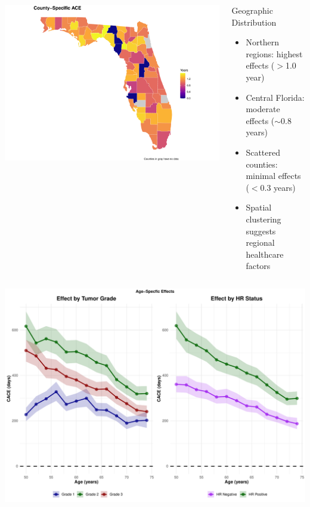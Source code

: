 \documentclass{beamer}
\begin{document}
 

  \begin{frame}{}
    \begin{columns}
  
    \includegraphics[width=1.1\textwidth]{pics/MapCACE.pdf}
    \begin{block}{Geographic Distribution}
        \begin{itemize}
        \item Northern regions: highest effects ($>$1.0 year)
        \item Central Florida: moderate effects ($\sim$0.8 years)
        \item Scattered counties: minimal effects ($<$0.3 years)
        \item Spatial clustering suggests regional healthcare factors
        \end{itemize}
        \end{block}
    \end{columns}
  \end{frame}

  \begin{frame}{}
    \includegraphics[width=\textwidth]{pics/Age_Specific Effects.pdf}
  
  \end{frame}
\end{document}
